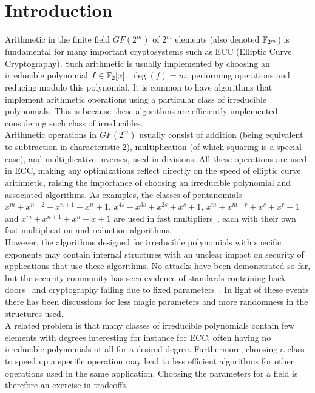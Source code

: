 \section{Introduction}

Arithmetic in the finite field $GF(2^m)$ of $2^m$ elements (also denoted $\mathbb{F}_{2^m}$) is fundamental for many important cryptosystems such as ECC (Elliptic Curve Cryptography). Such arithmetic is usually implemented by choosing an irreducible polynomial $f \in \mathbb{F}_2[x]$, $\deg(f) = m$, performing operations and reducing modulo this polynomial. It is common to have algorithms that implement arithmetic operations using a particular class of irreducible polynomials. This is because these algorithms are efficiently implemented considering such class of irreducibles.\\

Arithmetic operations in $GF(2^m)$ usually consist of addition (being equivalent to subtraction in characteristic 2), multiplication (of which squaring is a special case), and multiplicative inverses, used in divisions. All these operations are used in ECC, making any optimizations reflect directly on the speed of elliptic curve arithmetic, raising the importance of choosing an irreducible polynomial and associated algorithms. As examples, the classes of pentanomials $x^m+x^{n+2}+x^{n+1}+x^{n}+1$, $x^{4s}+x^{3s}+x^{2s}+x^s+1$, $x^m+x^{m-r}+x^s+x^r+1$ and $x^m+x^{n+1}+x^n+x+1$ are used in fast multipliers~\cite{fan2015survey}, each with their own fast multiplication and reduction algorithms.\\

However, the algorithms designed for irreducible polynomials with specific exponents may contain internal structures with an unclear impact on security of applications that use these algorithms. No attacks have been demonstrated so far, but the security community has seen evidence of standards containing back doors~\cite{bernstein2016dual} and cryptography failing due to fixed parameters~\cite{adrian2015imperfect}. In light of these events there has been discussions for less magic parameters and more randomness in the structures used.\\

A related problem is that many classes of irreducible polynomials contain few elements with degrees interesting for instance for ECC, often having no irreducible polynomials at all for a desired degree. Furthermore, choosing a class to speed up a specific operation may lead to less efficient algorithms for other operations used in the same application. Choosing the parameters for a field is therefore an exercise in tradeoffs.


